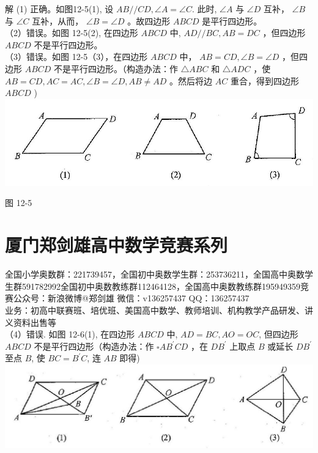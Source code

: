 \documentclass[10pt]{article}
\begin{document}
解 (1) 正确。如图12-5(1), 设 $A B / / C D, \angle A=\angle C$. 此时, $\angle A$ 与 $\angle D$ 互补， $\angle B$ 与 $\angle C$ 互补，从而， $\angle B=\angle D$ 。故四边形 $A B C D$ 是平行四边形。\\
（2）错误。如图 12-5(2), 在四边形 $A B C D$ 中, $A D / / B C, A B=D C$ ，但四边形 $A B C D$ 不是平行四边形。\\
（3）错误。如图 12-5（3），在四边形 $A B C D$ 中， $A B=C D, \angle B=\angle D$ ，但四边形 $A B C D$ 不是平行四边形。（构造办法：作 $\triangle A B C$ 和 $\triangle A D C$ ，使 $A B=C D, A C=A C, \angle B=\angle D, A B \neq A D$ 。然后将边 $A C$ 重合，得到四边形 $A B C D$ )\\
\includegraphics[max width=\textwidth, center]{2024_10_30_2c8f45efd4a519b08e1ag-112}

图 12-5

\section*{厦门郑剑雄高中数学竞赛系列}
全国小学奥数群：221739457，全国初中奥数学生群：253736211，全国高中奥数学生群591782992全国初中奥数教练群112464128，全国高中奥数教练群195949359竞赛公众号：新浪微博@郑剑雄 微信：v136257437 QQ：136257437\\
业务：初高中联赛班、培优班、美国高中数学、教师培训、机构教学产品研发、讲义资料出售等\\
（4）错误. 如图 12-6(1), 在四边形 $A B C D$ 中, $A D=B C, A O=O C$, 但四边形 $A B C D$ 不是平行四边形（构造办法：作 $\square A B^{\prime} C D$ ，在 $D B^{\prime}$ 上取点 $B$ 或延长 $D B^{\prime}$ 至点 $B$, 使 $B C=B^{\prime} C$, 连 $A B$ 即得)\\
\includegraphics[max width=\textwidth, center]{2024_10_30_2c8f45efd4a519b08e1ag-113(1)}
\end{document}
